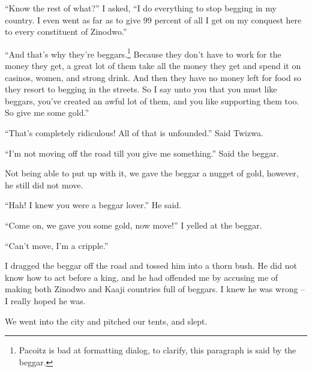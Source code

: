 ``Know the rest of what?'' I asked, ``I do everything to stop begging in my country. I even went as far as to give 99 percent of all I get on my conquest here to every constituent of Zinodwo.''

``And that's why they're beggars.\footnote{Pacoitz is bad at formatting dialog, to clarify, this paragraph is said by the beggar.} Because they don't have to work for the money they get, a great lot of them take all the money they get and spend it on casinos, women, and strong drink. And then they have no money left for food so they resort to begging in the streets. So I say unto you that you must like beggars, you've created an awful lot of them, and you like supporting them too. So give me some gold.''

``That's completely ridiculous! All of that is unfounded.'' Said Twizwa.

``I'm not moving off the road till you give me something.'' Said the beggar.

Not being able to put up with it, we gave the beggar a nugget of gold, however, he still did not move.

``Hah! I knew you were a beggar lover.'' He said.

``Come on, we gave you some gold, now move!'' I yelled at the beggar.

``Can't move, I'm a cripple.''

I dragged the beggar off the road and tossed him into a thorn bush. He did not know how to act before a king, and he had offended me by accusing me of making both Zinodwo and Kaaji countries full of beggars. I knew he was wrong -- I really hoped he was.

We went into the city and pitched our tents, and slept.
